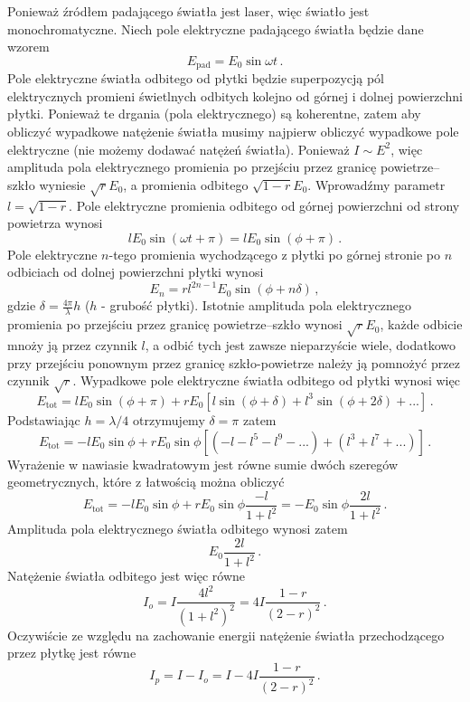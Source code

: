\documentclass[../main.tex]{subfiles}
\begin{document}
Ponieważ źródłem padającego światła jest laser, więc światło jest monochromatyczne. Niech pole elektryczne padającego światła będzie dane wzorem
\begin{equation*}
    E_\text{pad}=E_0\sin \omega t\,.
\end{equation*}
Pole elektryczne światła odbitego od płytki będzie superpozycją pól elektrycznych promieni świetlnych odbitych kolejno od górnej i dolnej powierzchni płytki. Ponieważ te drgania (pola elektrycznego) są koherentne, zatem aby obliczyć wypadkowe natężenie światła musimy najpierw obliczyć wypadkowe pole elektryczne (nie możemy dodawać natężeń światła). Ponieważ \(I\sim E^2\), więc amplituda pola elektrycznego promienia po przejściu przez granicę powietrze--szkło wyniesie \(\sqrt{r}E_0\), a promienia odbitego \(\sqrt{1-r}E_0\). Wprowadźmy parametr \(l=\sqrt{1-r}\). Pole elektryczne promienia odbitego od górnej powierzchni od strony powietrza wynosi
\begin{equation*}
    lE_0\sin(\omega t+\pi)=lE_0\sin(\phi+\pi)\,.
\end{equation*}
Pole elektryczne \(n\)-tego promienia wychodzącego z płytki po górnej stronie po \(n\) odbiciach od dolnej powierzchni płytki wynosi
\begin{equation*}
    E_n=rl^{2n-1}E_0\sin(\phi+n\delta)\,,
\end{equation*}
gdzie \(\delta=\frac{4\pi}{\lambda}h\) (\(h\) - grubość płytki). Istotnie amplituda pola elektrycznego promienia po przejściu przez granicę powietrze--szkło wynosi \(\sqrt{r}E_0\), każde odbicie mnoży ją przez czynnik \(l\), a odbić tych jest zawsze nieparzyście wiele, dodatkowo przy przejściu ponownym przez granicę szkło-powietrze należy ją pomnożyć przez czynnik \(\sqrt{r}\). Wypadkowe pole elektryczne światła odbitego od płytki wynosi więc
\begin{equation*}
    E_\text{tot}=lE_0\sin(\phi+\pi)+rE_0\left[l\sin(\phi+\delta)+l^3\sin(\phi+2\delta)+...\right]\,.
\end{equation*}
Podstawiając \(h=\lambda/4\) otrzymujemy \(\delta=\pi\) zatem
\begin{equation*}
    E_\text{tot}=-lE_0\sin\phi+rE_0\sin\phi\left[(-l-l^5-l^9-...)+(l^3+l^7+...)\right]\,.
\end{equation*}
Wyrażenie w nawiasie kwadratowym jest równe sumie dwóch szeregów geometrycznych, które z łatwością można obliczyć
\begin{equation*}
    E_\text{tot}=-lE_0\sin\phi+rE_0\sin\phi\frac{-l}{1+l^2}=-E_0\sin\phi \frac{2l}{1+l^2}\,.
\end{equation*}
Amplituda pola elektrycznego światła odbitego wynosi zatem
\begin{equation*}
    E_0\frac{2l}{1+l^2}\,.
\end{equation*}
Natężenie światła odbitego jest więc równe
\begin{equation*}
    I_{o}=I\frac{4l^2}{(1+l^2)^2}=4I\frac{1-r}{(2-r)^2}\,.
\end{equation*}
Oczywiście ze względu na zachowanie energii natężenie światła przechodzącego przez płytkę jest równe
\begin{equation*}
    I_p=I-I_o=I-4I\frac{1-r}{(2-r)^2}\,.
\end{equation*}
\end{document}
